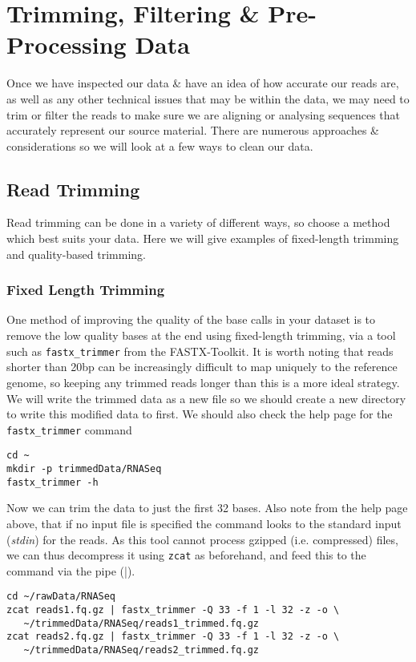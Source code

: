 \chapter{Trimming, Filtering \& Pre-Processing Data}


Once we have inspected our data \& have an idea of how accurate our reads are, as well as any other technical issues that may be within the data, we may need to trim or filter the reads to make sure we are aligning or analysing sequences that accurately represent our source material.
There are numerous approaches \& considerations so we will look at a few ways to clean our data.

\section{Read Trimming}
Read trimming can be done in a variety of different ways, so choose a method which best suits your data. 
Here we will give examples of fixed-length trimming and quality-based trimming.

\subsection{Fixed Length Trimming}
One method of improving the quality of the base calls in your dataset is to remove the low quality bases at the end using fixed-length trimming, via a tool such as \texttt{fastx_trimmer} from the FASTX-Toolkit.
It is worth noting that reads shorter than 20bp can be increasingly difficult to map uniquely to the reference genome, so keeping any trimmed reads longer than this is a more ideal strategy.
We will write the trimmed data as a new file so we should create a new directory to write this modified data to first.
We should also check the help page for the \texttt{fastx_trimmer} command
\begin{steps}
\begin{lstlisting}
cd ~
mkdir -p trimmedData/RNASeq
fastx_trimmer -h
\end{lstlisting}
\end{steps}

\begin{steps}
Now we can trim the data to just the first 32 bases.
Also note from the help page above, that if no input file is specified the command looks to the standard input (\textit{stdin}) for the reads.
As this tool cannot process gzipped (i.e. compressed) files, we can thus decompress it using \texttt{zcat} as beforehand, and feed this to the command via the pipe (|).
\begin{lstlisting}
cd ~/rawData/RNASeq
zcat reads1.fq.gz | fastx_trimmer -Q 33 -f 1 -l 32 -z -o \
   ~/trimmedData/RNASeq/reads1_trimmed.fq.gz
zcat reads2.fq.gz | fastx_trimmer -Q 33 -f 1 -l 32 -z -o \
   ~/trimmedData/RNASeq/reads2_trimmed.fq.gz
\end{lstlisting}
\end{steps}

